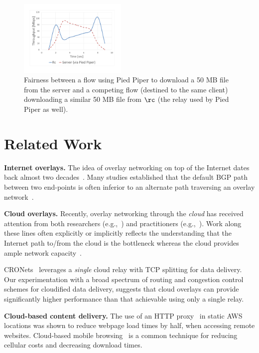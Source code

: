 \documentclass[newfonts=false,format=sigconf,10pt,letterpaper]{acmart}
\newcommand{\T}[1]{\smallskip\noindent\textbf{#1}} %
\newcommand{\name}{Pied Piper\xspace}
\begin{document}
\begin{figure}[!t]
  \centering
    \includegraphics[width=0.46\textwidth,trim=20mm 25mm 25mm 20mm,clip]{figures/DirecVsPiper.pdf}
    \caption{Fairness between a flow using \name to download a 50 MB file from the server and a competing flow (destined to the same client) downloading a similar 50 MB file from $\rc$ (the relay used by \name as well). 
    }
    \label{fig:direct-vs-piper}
\end{figure}


\section{Related Work}\label{sec:related-work}

\T{Internet overlays.} The idea of overlay networking on top of the Internet dates back almost two decades~\cite{old-overlay-1, old-overlay-2, RON}. Many studies established that the default BGP path between two end-points is often inferior to an alternate path traversing an overlay network~\cite{old-overlay-1, old-overlay-2, RON, akamai-2, akamai-3, akamai-4}.

\T{Cloud overlays.} Recently, overlay networking through the \emph{cloud} has received attention from both researchers (e.g.,~\cite{CRONets}) and practitioners (e.g.,~\cite{teridion}). Work along these lines often explicitly or implicitly reflects the understanding that the Internet path to/from the cloud is the bottleneck whereas the cloud provides ample network capacity~\cite{le2016understanding,jeyakumar2012eyeq}.

CRONets~\cite{CRONets} leverages a \emph{single} cloud relay with TCP splitting for data delivery. Our experimentation with a broad spectrum of routing and congestion control schemes for cloudified data delivery, suggests that cloud overlays can provide significantly higher performance than that achievable using only a single relay.

\T{Cloud-based content delivery.} The use of an HTTP proxy~\cite{cgn2017} in static AWS locations was shown to reduce webpage load times by half, when accessing remote websites. Cloud-based mobile browsing~\cite{zhao2011reducing,wang2013accelerating} is a common technique for reducing cellular costs and decreasing download times.
\end{document}
